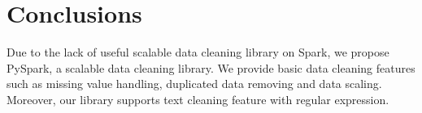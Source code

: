 \documentclass[sigconf]{acmart}
\begin{document}
\section{Conclusions}
Due to the lack of useful scalable data cleaning library on Spark, we propose PySpark, a scalable data cleaning library. We provide basic data cleaning features such as missing value handling, duplicated data removing and data scaling. Moreover, our library supports text cleaning feature with regular expression.



\end{document}
